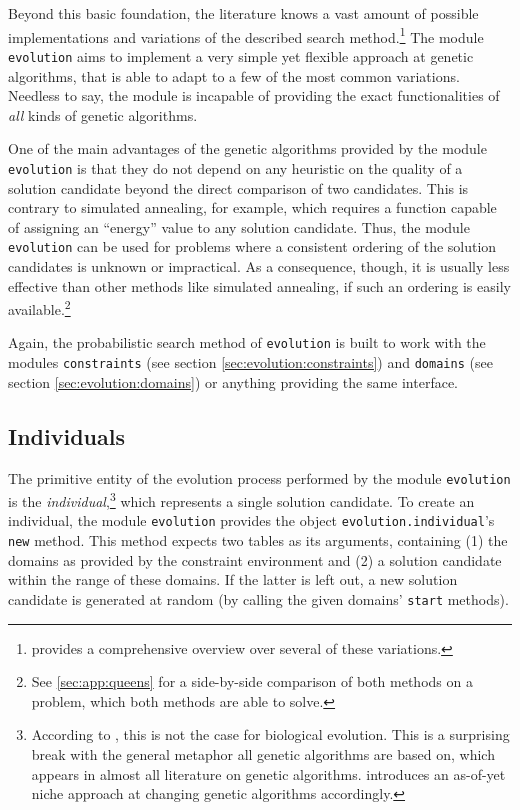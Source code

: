 Beyond this basic foundation, the literature knows a vast amount of possible implementations and variations of the described search method.\footnote{\cite{EibenSmith2007} provides a comprehensive overview over several of these variations.} The module \texttt{evolution} aims to implement a very simple yet flexible approach at genetic algorithms, that is able to adapt to a few of the most common variations. Needless to say, the module is incapable of providing the exact functionalities of \emph{all} kinds of genetic algorithms.

One of the main advantages of the genetic algorithms provided by the module \texttt{evolution} is that they do not depend on any heuristic on the quality of a solution candidate beyond the direct comparison of two candidates. This is contrary to simulated annealing, for example, which requires a function capable of assigning an ``energy'' value to any solution candidate. Thus, the module \texttt{evolution} can be used for problems where a consistent ordering of the solution candidates is unknown or impractical. As a consequence, though, it is usually less effective than other methods like simulated annealing, if such an ordering is easily available.\footnote{See \ref{sec:app:queens} for a side-by-side comparison of both methods on a problem, which both methods are able to solve.}

Again, the probabilistic search method of \texttt{evolution} is built to work with the modules \texttt{constraints} (see section \ref{sec:evolution:constraints}) and \texttt{domains} (see section \ref{sec:evolution:domains}) or anything providing the same interface.

\subsection{Individuals}
\label{sec:evolution:individuals}

The primitive entity of the evolution process performed by the module \texttt{evolution} is the \emph{individual},\footnote{According to \cite{Dawkins1990}, this is not the case for biological evolution. This is a surprising break with the general metaphor all genetic algorithms are based on, which appears in almost all literature on genetic algorithms. \cite{CornoReordaSquillero1998} introduces an as-of-yet niche approach at changing genetic algorithms accordingly.} which represents a single solution candidate. To create an individual, the module \texttt{evolution} provides the object \texttt{evolution.individual}'s  \texttt{new} method. This method expects two tables as its arguments, containing (1) the domains as provided by the constraint environment and (2) a solution candidate within the range of these domains. If the latter is left out, a new solution candidate is generated at random (by calling the given domains' \texttt{start} methods).

